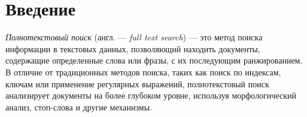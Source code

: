 
\section*{Введение}








\textit{Полнотекстовый поиск} (англ. --- \textit{full text search}) --- это метод поиска информации в текстовых данных, позволяющий находить документы, содержащие определенные слова или фразы, с их последующим ранжированием.
В отличие от традиционных методов поиска, таких как поиск по индексам, ключам или применение регулярных выражений, полнотекстовый поиск анализирует документы на более глубоком уровне, используя морфологический анализ, стоп-слова и другие механизмы.

